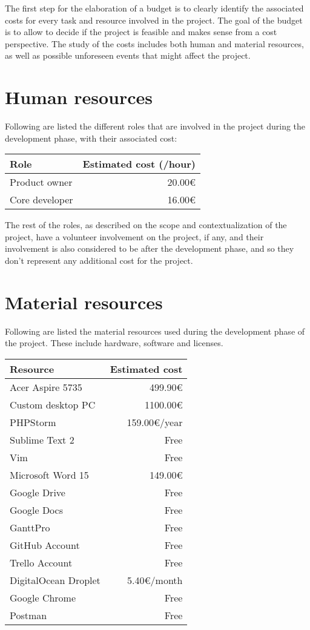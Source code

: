 The first step for the elaboration of a budget is to clearly identify the associated costs for every task and resource involved in the project. The goal of the budget is to allow to decide if the project is feasible and makes sense from a cost perspective. The study of the costs includes both human and material resources, as well as possible unforeseen events that might affect the project.

\section{Human resources}
Following are listed the different roles that are involved in the project during the development phase, with their associated cost:
\hfill\break
\begin{center}
    \begin{tabular}{ | l | r |}
    	\hline
 		\textbf{Role} & \textbf{Estimated cost (/hour)} \\ \hline
 		Product owner & 20.00\euro{} \\ \hline
 		Core developer & 16.00\euro{} \\ \hline
    \end{tabular}
\end{center}
\hfill\break
The rest of the roles, as described on the scope and contextualization of the project, have a volunteer involvement on the project, if any, and their involvement is also considered to be after the development phase, and so they don’t represent any additional cost for the project.

\section{Material resources}
Following are listed the material resources used during the development phase of the project. These include hardware, software and licenses.
\hfill\break
\begin{center}
    \begin{tabular}{ | l | r |}
    	\hline
 		\textbf{Resource} & \textbf{Estimated cost} \\ \hline
 		Acer Aspire 5735 & 499.90\euro{} \\ \hline
 		Custom desktop PC & 1100.00\euro{} \\ \hline
 		PHPStorm & 159.00\euro{}/year \\ \hline
 		Sublime Text 2 & Free \\ \hline
 		Vim & Free \\ \hline
 		Microsoft Word 15 & 149.00\euro{} \\ \hline
 		Google Drive & Free \\ \hline
 		Google Docs & Free \\ \hline
 		GanttPro & Free \\ \hline
 		GitHub Account & Free \\ \hline
 		Trello Account & Free \\ \hline
 		DigitalOcean Droplet & 5.40\euro{}/month \\ \hline
 		Google Chrome & Free \\ \hline
 		Postman & Free \\ \hline
    \end{tabular}
\end{center}
